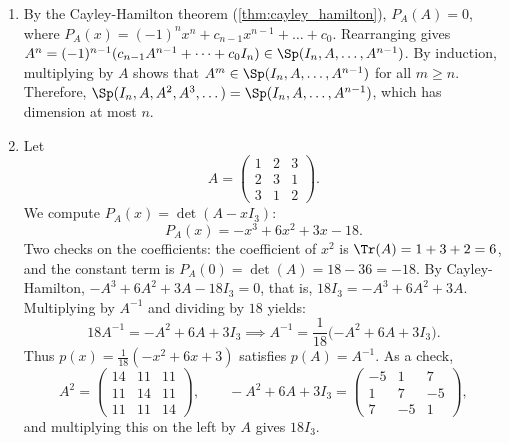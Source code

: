 \begin{exercisesolution}
\label{sol:subspace_matrix_powers_and_inverse}
\begin{enumerate}[label=\textbf{(\alph*)}]
    \item By the Cayley-Hamilton theorem (\cref{thm:cayley_hamilton}), $P_A(A) = 0$, where $P_A(x) = (-1)^n x^n + c_{n-1} x^{n-1} + \dots + c_0$.
    Rearranging gives $A^n = (-1)^{n-1}(c_{n-1} A^{n-1} + \dots + c_0 I_n) \in \Sp(I_n, A, \dots, A^{n-1})$.
    By induction, multiplying by $A$ shows that $A^m \in \Sp(I_n, A, \dots, A^{n-1})$ for all $m \ge n$.
    Therefore, $\Sp(I_n, A, A^2, A^3, \dots) = \Sp(I_n, A, \dots, A^{n-1})$, which has dimension at most $n$.

    \item Let
    \[
    A = \begin{pmatrix} 1 & 2 & 3 \\ 2 & 3 & 1 \\ 3 & 1 & 2 \end{pmatrix}.
    \]
    We compute $P_A(x) = \det(A - x I_3)$:
    \[
    P_A(x) = -x^3 + 6x^2 + 3x - 18.
    \]
    Two checks on the coefficients: the coefficient of $x^2$ is $\Tr(A) = 1 + 3 + 2 = 6$, and the constant term is $P_A(0) = \det(A) = 18 - 36 = -18$.
    By Cayley-Hamilton, $-A^3 + 6A^2 + 3A - 18 I_3 = 0$, that is, $18 I_3 = -A^3 + 6A^2 + 3A$.
    Multiplying by $A^{-1}$ and dividing by $18$ yields:
    \[
    18 A^{-1} = -A^2 + 6A + 3I_3 \implies A^{-1} = \frac{1}{18}\big({-A^2} + 6A + 3I_3\big).
    \]
    Thus $p(x) = \frac{1}{18}(-x^2 + 6x + 3)$ satisfies $p(A) = A^{-1}$. As a check,
    \[
    A^2 = \begin{pmatrix} 14 & 11 & 11 \\ 11 & 14 & 11 \\ 11 & 11 & 14 \end{pmatrix}, \qquad
    -A^2 + 6A + 3I_3 = \begin{pmatrix} -5 & 1 & 7 \\ 1 & 7 & -5 \\ 7 & -5 & 1 \end{pmatrix},
    \]
    and multiplying this on the left by $A$ gives $18 I_3$. \qedhere
\end{enumerate}
\end{exercisesolution}

